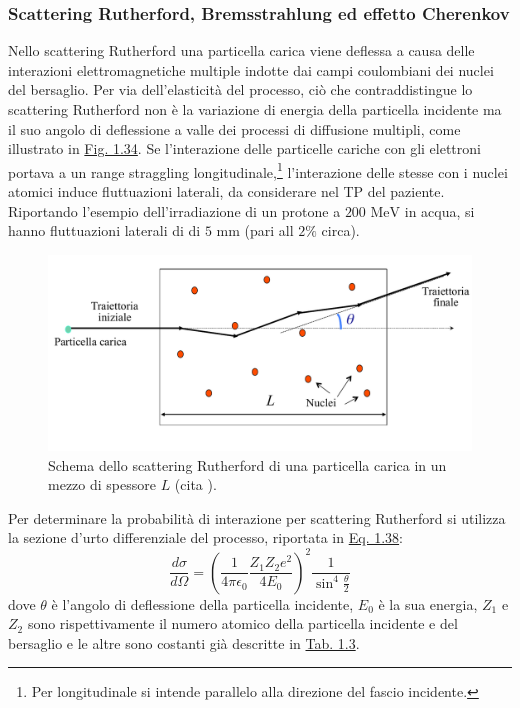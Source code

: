 \documentclass[12pt,a4paper,twoside]{report}
\begin{document}
	\subsubsection{Scattering Rutherford, Bremsstrahlung ed effetto Cherenkov}\label{par:scattering_Rutherford}
	Nello scattering Rutherford una particella carica viene deflessa a causa delle interazioni elettromagnetiche multiple indotte dai campi coulombiani dei nuclei del bersaglio. Per via dell'elasticità del processo, ciò che contraddistingue lo scattering Rutherford non è la variazione di energia della particella incidente ma il suo angolo di deflessione a valle dei processi di diffusione multipli, come illustrato in \hyperref[fig:rutherford_scattering]{Fig. 1.34}. Se l'interazione delle particelle cariche con gli elettroni portava a un range straggling longitudinale,\footnote{Per longitudinale si intende parallelo alla direzione del fascio incidente.} l'interazione delle stesse con i nuclei atomici induce fluttuazioni laterali, da considerare nel TP del paziente. Riportando l'esempio dell'irradiazione di un protone a $200\mbox{ MeV}$ in acqua, si hanno fluttuazioni laterali di di $5\mbox{ mm}$ (pari all $2\%$ circa).
	\begin{figure}[H]
		\centering
		\includegraphics[width=0.9\linewidth]{rutherford_scattering.pdf}
		\caption{Schema dello scattering Rutherford di una particella carica in un mezzo di spessore $L$ (cita
			).}
		\label{fig:rutherford_scattering}
	\end{figure}
	Per determinare la probabilità di interazione per scattering Rutherford si utilizza la sezione d'urto differenziale del processo, riportata in \hyperref[eq:rutherford_scattering]{Eq. 1.38}:
	\begin{equation}
		\frac{d\sigma}{d\Omega}=\left(\frac{1}{4\pi\epsilon_0}\frac{Z_1Z_2e^2}{4E_0}\right)^2\frac{1}{\sin^4{\frac{\theta}{2}}}
		\label{eq:rutherford_scattering}
	\end{equation}
	dove $\theta$ è l'angolo di deflessione della particella incidente, $E_0$ è la sua energia, $Z_1$ e $Z_2$ sono rispettivamente il numero atomico della particella incidente e del bersaglio e le altre sono costanti già descritte in \hyperref[tab:bethe_bloch]{Tab. 1.3}.
	
\end{document}

